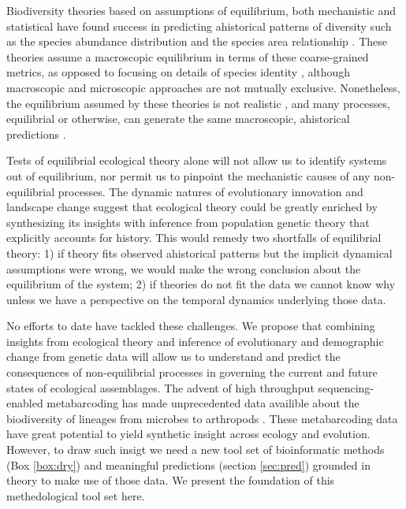 \documentclass[12pt]{article}
\newcounter{Box}
\begin{document}
Biodiversity theories based on assumptions of equilibrium, both
mechanistic \citep{hubbell2001, chesson2000, tilman2004} and
statistical \citep[see the Glossary;][]{harte2011, pueyo2007}
have found success in predicting ahistorical patterns of diversity
such as the species abundance distribution \citep{white2012,
  hubbell2001, harte2011} and the species area relationship
\citep{hubbell2001, harte2011}. These theories assume a
macroscopic equilibrium in terms of these coarse-grained metrics, as
opposed to focusing on details of species identity \citep[such as
in][]{blonder2015}, although macroscopic and microscopic approaches
are not mutually exclusive.  Nonetheless, the equilibrium assumed by
these theories is not realistic \citep{ricklefs2006}, and many
processes, equilibrial or otherwise, can generate the same
macroscopic, ahistorical predictions \citep{mcgill2007}.

Tests of equilibrial ecological theory alone will not allow us to
identify systems out of equilibrium, nor permit us to pinpoint the
mechanistic causes of any non-equilibrial processes. The dynamic
natures of evolutionary innovation and landscape change suggest that
ecological theory could be greatly enriched by synthesizing its
insights with inference from population genetic theory that explicitly
accounts for history. This would remedy two shortfalls of equilibrial
theory: 1) if theory fits observed ahistorical patterns but the
implicit dynamical assumptions were wrong, we would make the wrong
conclusion about the equilibrium of the system; 2) if theories do not
fit the data we cannot know why unless we have a perspective on the
temporal dynamics underlying those data.

No efforts to date have tackled these challenges. We propose that
combining insights from ecological theory and inference of
evolutionary and demographic change from genetic data will allow us to
understand and predict the consequences of non-equilibrial processes
in governing the current and future states of ecological
assemblages. The advent of high throughput sequencing-enabled metabarcoding has made unprecedented data availible about the biodiversity of lineages from microbes to arthropods \citep{taberlet2012,
  gibson2014, shokralla2015, ji2013, zhou2013, bohmann2014,
  linard2015, leray2015, dodsworth2015, liu2016, venkataraman2015}. These metabarcoding data have great potential to yield synthetic insight across ecology and evolution.  However, to draw such insigt we need a new tool set
of bioinformatic methods (Box \ref{box:dry}) and meaningful
predictions (section \ref{sec:pred}) grounded in theory to make use of
those data. We present the foundation of this methedological tool set here.
\end{document}
